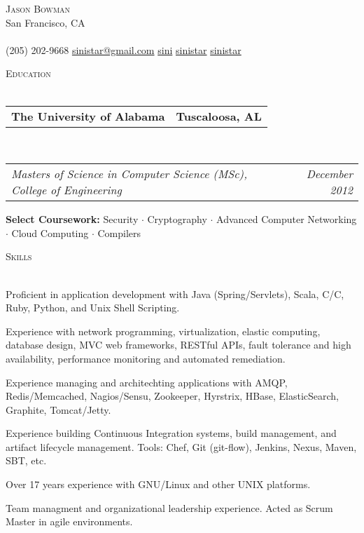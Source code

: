 \documentclass[10pt,letterpaper]{article}
\makeatletter
\newcommand{\area}[2]{\textbf{#1:}   #2}
\newcommand{\lineunder}{\vspace*{-8pt} \\ \hspace*{-18pt} \hrulefill \\}
\newcommand{\header}[1]{{\hspace*{-15pt}\vspace*{6pt} \textsc{#1}} \vspace*{-6pt} \lineunder}
\newcommand{\contact}[3]{
\vspace*{-8pt}
\begin{center}
{\LARGE \scshape {#1}}\\
#2 \lineunder 
#3
\end{center}
\vspace*{-8pt}
}
\newcommand{\headerrow}[2]
{\begin{tabular*}{\linewidth}{l@{\extracolsep{\fill}}r}
	#1 &
	#2 \\
\end{tabular*}}
\newcommand{\CPP}
{C\nolinebreak[4]\hspace{-.05em}\raisebox{.22ex}{\footnotesize\bf ++}}
\newcommand{\education}[5]{
	\headerrow
		{\textbf{#1}}
		{\textbf{#2}}
	\\
	\headerrow
		{\emph{#3}}
		{\emph{#4}}
	\begin{itemize*}
		\item #5
	\end{itemize*}
}
\makeatother
\begin{document}
\small
\smallskip
\vspace*{-30pt}

\contact{Jason Bowman}
{San Francisco, CA}
{\faPhone \hspace{0.1em} (205) 202-9668 \hspace{0.1em} \faEnvelope \hspace{0.1em}
  \href{mailto:sinistar@gmail.com}{sinistar@gmail.com} \hspace{0.1em} \faGithub \hspace{0.1em} \href{https://www.github.com/sini}{sini} \hspace{0.1em} \faTwitter
  \hspace{0.1em} \href{https://www.twitter.com/sinistar}{sinistar} \hspace{0.1em} \faLinkedin \hspace{0.1em}
  \href{https://linkedin.com/in/sinistar}{sinistar}}

\vspace*{3pt}

\header{Education}
\education{The University of Alabama}{Tuscaloosa, AL}{Masters of Science in
  Computer Science (MSc), College of Engineering}{December 2012}{\area{Select
    Coursework}{Security $\cdot$ Cryptography $\cdot$ Advanced Computer
    Networking $\cdot$ Cloud Computing $\cdot$ Compilers}}


\vspace*{3pt}

\header{Skills}
\begin{itemize*}
\item Proficient in application development with Java (Spring/Servlets), Scala, C/\CPP, Ruby, Python, and Unix Shell Scripting.
\item Experience with network programming, virtualization, elastic computing, database design, MVC web frameworks, RESTful APIs, fault tolerance and high availability, performance monitoring and automated remediation.
\item Experience managing and architechting applications with AMQP, Redis/Memcached, Nagios/Sensu, Zookeeper, Hyrstrix, HBase, ElasticSearch, Graphite, Tomcat/Jetty.
\item Experience building Continuous Integration systems, build management, and artifact lifecycle management. Tools: Chef, Git (git-flow), Jenkins, Nexus, Maven, SBT, etc.
\item Over 17 years experience with GNU/Linux and other UNIX platforms.
\item Team managment and organizational leadership experience. Acted as Scrum Master in agile environments.
\end{itemize*}
\vspace*{3pt}
\end{document}
